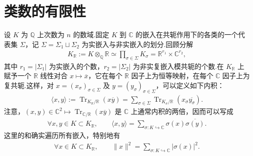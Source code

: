 \section{类数的有限性}\label{sec:nt-5-2}
设 $K$ 为 $\mathbb Q$ 上次数为 $n$ 的数域.固定 $K$ 到 $\mathbb C$ 的嵌入在共轭作用下的各类的一个代表集 $\Sigma$，记 $\Sigma=\Sigma_1\sqcup\Sigma_2$ 为实嵌入与非实嵌入的划分.回顾分解
\begin{align*}
K_{\mathbb R}:=K\otimes_{\mathbb Q}\mathbb R\simeq\prod_{\sigma\in\Sigma}K_\sigma=\mathbb R^{r_1}\times\mathbb C^{r_2},
\end{align*}
其中 $r_1=|\Sigma_1|$ 为实嵌入的个数，$r_2=|\Sigma_2|$ 为非实复嵌入模共轭的个数.在 $K_{\mathbb R}$ 上赋予一个 $\mathbb R$ 线性对合 $x\mapsto\overline x$，它在每个 $\mathbb R$ 因子上为恒等映射，在每个 $\mathbb C$ 因子上为复共轭.这样，对 $x=(x_\sigma)_{\sigma\in\Sigma}$ 及 $y=(y_\sigma)_{\sigma\in\Sigma}$，可以定义如下内积：
\begin{align*}
\langle x,y\rangle:=\operatorname{Tr}_{K_{\mathbb R}/\mathbb R}(x\overline y)=\sum_{\sigma\in\Sigma}\operatorname{Tr}_{K_\sigma/\mathbb R}(x_\sigma\overline{y_\sigma}).
\end{align*}
注意，$(x,y)\in\mathbb C^2\mapsto\operatorname{Tr}_{\mathbb C/\mathbb R}(x\overline y)$ 是 $\mathbb C$ 上通常内积的两倍，因而可以写成
\begin{align*}
\forall x,y\in K\subset K_{\mathbb R},\qquad \langle x,y\rangle=\sum_{\sigma\colon K\hookrightarrow\mathbb C}\sigma(x)\overline{\sigma(y)}.\tag{$*$}\label{eq:nt-5-2-inner}
\end{align*}
这里的和确实遍历所有嵌入，特别地有
\begin{align*}
\forall x\in K\subset K_{\mathbb R},\qquad \|x\|^2=\sum_{\sigma\colon K\hookrightarrow\mathbb C}|\sigma(x)|^2.\tag{$**$}\label{eq:nt-5-2-length}
\end{align*}
